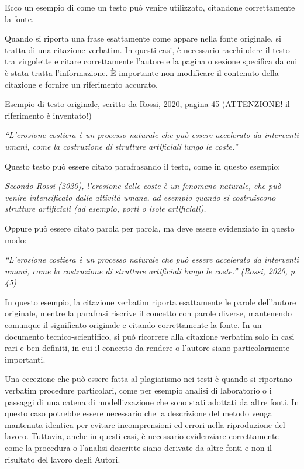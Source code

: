 \documentclass[9pt,a4paper,twoside]{rho-class/rho}
\begin{document}
Ecco un esempio di come un testo può venire utilizzato, citandone correttamente la fonte.

\begin{info}
Quando si riporta una frase esattamente come appare nella fonte originale, si tratta di una citazione verbatim. In questi casi, è necessario racchiudere il testo tra virgolette e citare correttamente l’autore e la pagina o sezione specifica da cui è stata tratta l’informazione. È importante non modificare il contenuto della citazione e fornire un riferimento accurato.

Esempio di testo originale, scritto da Rossi, 2020, pagina 45 (ATTENZIONE! il riferimento è inventato!)

\textit{“L’erosione costiera è un processo naturale che può essere accelerato da interventi umani, come la costruzione di strutture artificiali lungo le coste.”}

Questo testo può essere citato parafrasando il testo, come in questo esempio:

\textit{Secondo Rossi (2020), l’erosione delle coste è un fenomeno naturale, che può venire intensificato dalle attività umane, ad esempio quando si costruiscono strutture artificiali (ad esempio, porti o isole artificiali).}

Oppure può essere citato parola per parola, ma deve essere evidenziato in questo modo:

\textit{“L’erosione costiera è un processo naturale che può essere accelerato da interventi umani, come la costruzione di strutture artificiali lungo le coste.” (Rossi, 2020, p. 45)}

In questo esempio, la citazione verbatim riporta esattamente le parole dell’autore originale, mentre la parafrasi riscrive il concetto con parole diverse, mantenendo comunque il significato originale e citando correttamente la fonte. In un documento tecnico-scientifico, si può ricorrere alla citazione verbatim solo in casi rari e ben definiti, in cui il concetto da rendere o l'autore siano particolarmente importanti.
\end{info}

Una eccezione che può essere fatta al plagiarismo nei testi è quando si riportano verbatim procedure particolari, come per esempio analisi di laboratorio o i passaggi di una catena di modellizzazione che sono stati adottati da altre fonti. In questo caso potrebbe essere necessario che la descrizione del metodo venga mantenuta identica per evitare incomprensioni ed errori nella riproduzione del lavoro. Tuttavia, anche in questi casi, è necessario evidenziare correttamente come la procedura o l'analisi descritte siano derivate da altre fonti e non il risultato del lavoro degli Autori.
\end{document}
